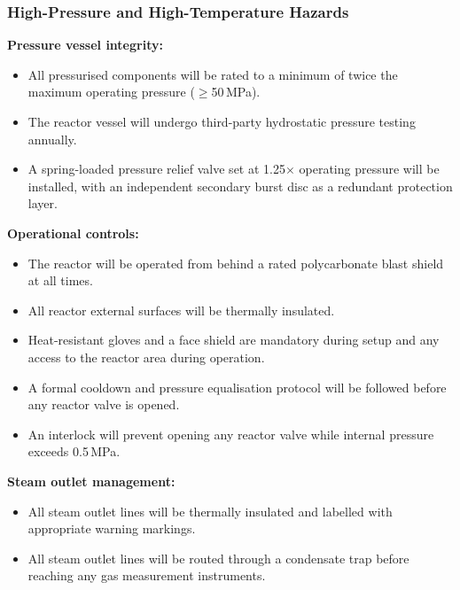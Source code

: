 \documentclass[12pt]{article}
\begin{document}
\subsubsection{High-Pressure and High-Temperature Hazards}

\noindent\textbf{Pressure vessel integrity:}
\begin{itemize}[itemsep=3pt]
    \item All pressurised components will be rated to a minimum of twice the
          maximum operating pressure ($\geq$50\,MPa).
    \item The reactor vessel will undergo third-party hydrostatic pressure testing
          annually.
    \item A spring-loaded pressure relief valve set at 1.25$\times$ operating
          pressure will be installed, with an independent secondary burst disc as
          a redundant protection layer.
\end{itemize}

\medskip
\noindent\textbf{Operational controls:}
\begin{itemize}[itemsep=3pt]
    \item The reactor will be operated from behind a rated polycarbonate blast
          shield at all times.
    \item All reactor external surfaces will be thermally insulated.
    \item Heat-resistant gloves and a face shield are mandatory during setup and
          any access to the reactor area during operation.
    \item A formal cooldown and pressure equalisation protocol will be followed
          before any reactor valve is opened.
    \item An interlock will prevent opening any reactor valve while internal
          pressure exceeds 0.5\,MPa.
\end{itemize}

\medskip
\noindent\textbf{Steam outlet management:}
\begin{itemize}[itemsep=3pt]
    \item All steam outlet lines will be thermally insulated and labelled with
          appropriate warning markings.
    \item All steam outlet lines will be routed through a condensate trap before
          reaching any gas measurement instruments.
\end{itemize}
\end{document}
